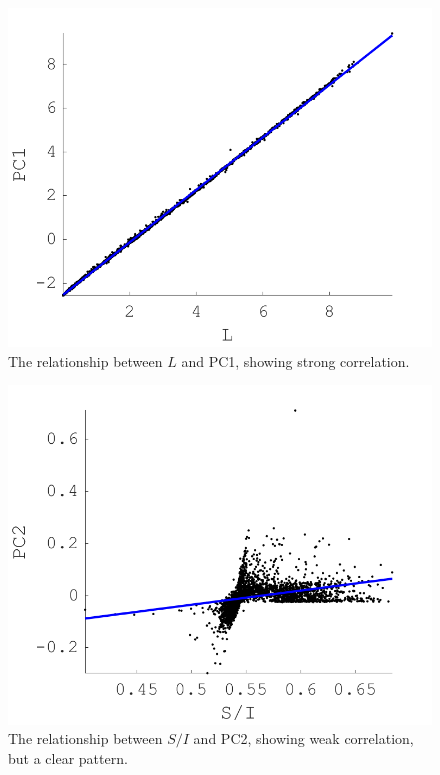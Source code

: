 \begin{figure}[htbp]
 \includegraphics[max width=\textwidth]{figs/comp/melcomp_3/20.png}
 \caption{The relationship between $L$ and \gls{PC1}, showing strong correlation.}
 \label{fig:L-PC1}
\end{figure} 

\begin{figure}[htbp]
 \includegraphics[max width=\textwidth]{figs/comp/melcomp_3/21.png}
 \caption{The relationship between $S/I$ and \gls{PC2}, showing weak correlation, but a clear pattern.}
 \label{fig:S/I-PC2}
\end{figure} 

